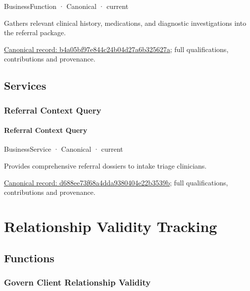 \label{element:b4a05bf97e844c24b04d27a6b325627a}
{\small BusinessFunction · Canonical · current}\par

Gathers relevant clinical history, medications, and diagnostic investigations into the referral package.


{\footnotesize \href{../../../../continuum/business/business-function/b4a05bf97e844c24b04d27a6b325627a.md}{Canonical record: b4a05bf97e844c24b04d27a6b325627a}; full qualifications, contributions and provenance.}\par
\subsection{Services}

\subsubsection{Referral Context Query}

\paragraph{Referral Context Query}

\label{element:d688ee73f68a4dda9380404e22b3539b}
{\small BusinessService · Canonical · current}\par

Provides comprehensive referral dossiers to intake triage clinicians.


{\footnotesize \href{../../../../continuum/business/business-service/d688ee73f68a4dda9380404e22b3539b.md}{Canonical record: d688ee73f68a4dda9380404e22b3539b}; full qualifications, contributions and provenance.}\par
\section{Relationship Validity Tracking}

\subsection{Functions}

\subsubsection{Govern Client Relationship Validity}

